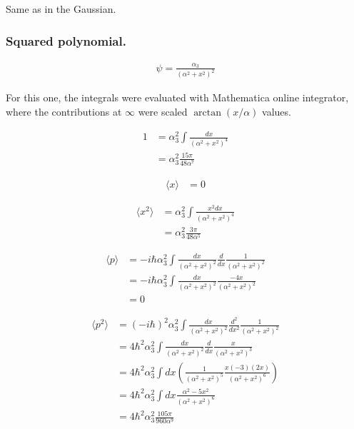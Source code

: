 \documentclass{article}
\newcommand{\expectation}[1]{\langle{#1}\rangle}
\begin{document}
Same as in the Gaussian.

\subsubsection{ Squared polynomial. }

\begin{align*}
\psi = \frac{\alpha_3}{(\alpha^2 + x^2)^2}
\end{align*}

For this one, the integrals were evaluated with Mathematica online integrator, where the contributions at $\infty$ were scaled $\arctan(x/\alpha)$ values.

\begin{align*}
1 
&= \alpha_3^2 \int \frac{dx}{(\alpha^2 + x^2)^4} \\
&= \alpha_3^2 \frac{15 \pi}{48 \alpha^7}
\end{align*}

\begin{align*}
\expectation{x} &= 0
\end{align*}

\begin{align*}
\expectation{x^2} 
&= \alpha_3^2 \int \frac{x^2 dx}{(\alpha^2 + x^2)^4} \\
&= \alpha_3^2 \frac{3 \pi}{48 \alpha^5}
\end{align*}

\begin{align*}
\expectation{p} 
&= -i \hbar \alpha_3^2 \int \frac{dx}{(\alpha^2 + x^2)^2} \frac{d}{dx} \frac{1}{(\alpha^2 + x^2)^2}  \\
&= -i \hbar \alpha_3^2 \int \frac{dx}{(\alpha^2 + x^2)^2} \frac{-4x}{(\alpha^2 + x^2)^2} \\
&= 0
\end{align*}

\begin{align*}
\expectation{p^2} 
&= (-i \hbar)^2 \alpha_3^2 \int \frac{dx}{(\alpha^2 + x^2)^2} \frac{d^2}{dx^2} \frac{1}{(\alpha^2 + x^2)^2}  \\
&= 4 \hbar^2 \alpha_3^2 \int \frac{dx}{(\alpha^2 + x^2)^2} \frac{d}{dx} \frac{x}{(\alpha^2 + x^2)^3} \\
&= 4 \hbar^2 \alpha_3^2 \int dx
\left( \frac{1}{(\alpha^2 + x^2)^5} \frac{x(-3)(2x)}{(\alpha^2 + x^2)^6} \right)
\\
&= 4 \hbar^2 \alpha_3^2 \int dx \frac{\alpha^2 - 5x^2}{(\alpha^2 + x^2)^6} 
\\
&= 4 \hbar^2 \alpha_3^2 \frac{105 \pi}{960 \alpha^9}
\\
\end{align*}
\end{document}
